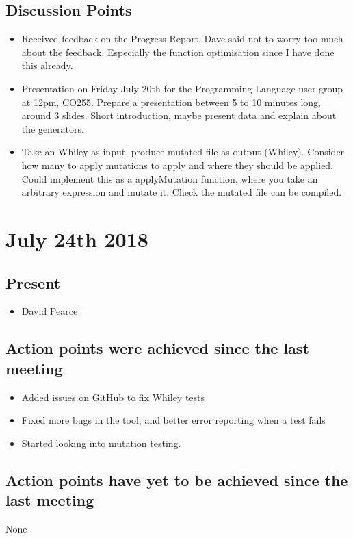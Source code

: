 \documentclass[]{article}
\begin{document}
\subsection{Discussion Points}
\begin{itemize}
	\item Received feedback on the Progress Report. Dave said not to worry too much about the feedback. Especially the function optimisation since I have done this already. 
	\item Presentation on Friday July 20th for the Programming Language user group at 12pm, CO255. Prepare a presentation between 5 to 10 minutes long, around 3 slides. Short introduction, maybe present data and explain about the generators.
	\item Take an Whiley as input, produce mutated file as output (Whiley). Consider how many to apply mutations to apply and where they should be applied. Could implement this as a applyMutation function, where you take an arbitrary expression and mutate it. Check the mutated file can be compiled.
\end{itemize}


\section{July 24th 2018}
\subsection{Present}
\begin{itemize}
	\item David Pearce
\end{itemize}

\subsection{Action points were achieved since the last meeting}
\begin{itemize}
	\item Added issues on GitHub to fix Whiley tests
	\item Fixed more bugs in the tool, and better error reporting when a test fails
	\item Started looking into mutation testing.
\end{itemize}
\subsection{Action points have yet to be achieved since the last meeting}
None
\end{document}
